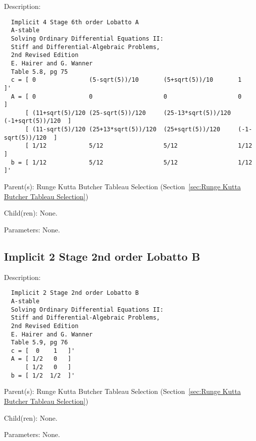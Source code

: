 \begin{list}{}
  {\setlength{\leftmargin}{1.0in}
   \setlength{\labelwidth}{0.75in}
   \setlength{\labelsep}{0.125in}}
  \item[Description:]
\begin{verbatim}
  Implicit 4 Stage 6th order Lobatto A
  A-stable
  Solving Ordinary Differential Equations II:
  Stiff and Differential-Algebraic Problems,
  2nd Revised Edition
  E. Hairer and G. Wanner
  Table 5.8, pg 75
  c = [ 0               (5-sqrt(5))/10       (5+sqrt(5))/10       1                 ]'
  A = [ 0               0                    0                    0                 ]
      [ (11+sqrt(5)/120 (25-sqrt(5))/120     (25-13*sqrt(5))/120  (-1+sqrt(5))/120  ]
      [ (11-sqrt(5)/120 (25+13*sqrt(5))/120  (25+sqrt(5))/120     (-1-sqrt(5))/120  ]
      [ 1/12            5/12                 5/12                 1/12              ]
  b = [ 1/12            5/12                 5/12                 1/12              ]'
\end{verbatim}
  \item[Parent(s):]
    Runge Kutta Butcher Tableau Selection (Section~\ref{sec:Runge Kutta Butcher Tableau Selection})
  \item[Child(ren):]
    None. 
  \item[Parameters:]
    None. 
\end{list}

\subsection{Implicit 2 Stage 2nd order Lobatto B}
\label{sec:Implicit 2 Stage 2nd order Lobatto B}

\begin{list}{}
  {\setlength{\leftmargin}{1.0in}
   \setlength{\labelwidth}{0.75in}
   \setlength{\labelsep}{0.125in}}
  \item[Description:]
\begin{verbatim}
  Implicit 2 Stage 2nd order Lobatto B
  A-stable
  Solving Ordinary Differential Equations II:
  Stiff and Differential-Algebraic Problems,
  2nd Revised Edition
  E. Hairer and G. Wanner
  Table 5.9, pg 76
  c = [  0    1   ]'
  A = [ 1/2   0   ]
      [ 1/2   0   ]
  b = [ 1/2  1/2  ]'
\end{verbatim}
  \item[Parent(s):]
    Runge Kutta Butcher Tableau Selection (Section~\ref{sec:Runge Kutta Butcher Tableau Selection})
  \item[Child(ren):]
    None. 
  \item[Parameters:]
    None. 
\end{list}

